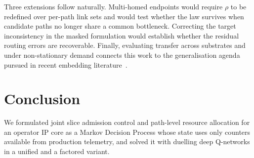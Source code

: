 \documentclass[10pt,journal,comsoc]{IEEEtran}
\begin{document}
Three extensions follow naturally. Multi-homed endpoints would require
$\rho$ to be redefined over per-path link sets and would test whether the
law survives when candidate paths no longer share a common bottleneck.
Correcting the target inconsistency in the masked formulation would
establish whether the residual routing errors are recoverable. Finally,
evaluating transfer across substrates and under non-stationary demand
connects this work to the generalisation agenda pursued in recent
embedding literature~\cite{wang2024flagvne}.

\section{Conclusion} \label{conclusion}
We formulated joint slice admission control and path-level resource
allocation for an operator IP core as a Markov Decision Process whose
state uses only counters available from production telemetry, and solved
it with duelling deep Q-networks in a unified and a factored variant.
\end{document}
